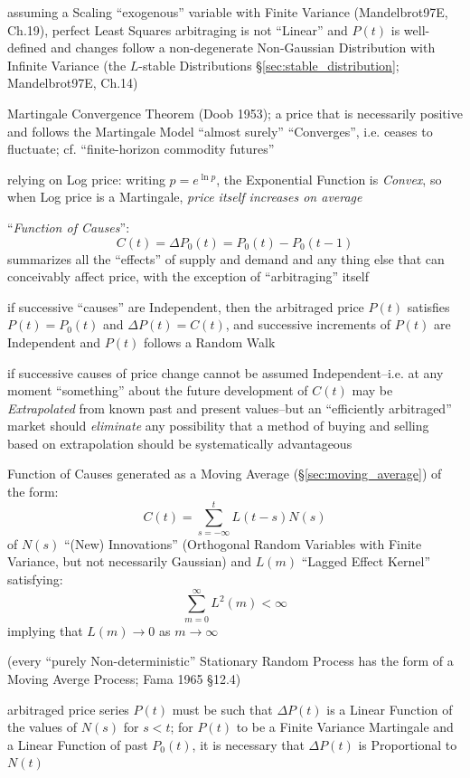 assuming a Scaling ``exogenous'' variable with Finite Variance (Mandelbrot97E,
Ch.19), perfect Least Squares arbitraging is not ``Linear'' and $P(t)$ is
well-defined and changes follow a non-degenerate Non-Gaussian Distribution with
Infinite Variance (the $L$-stable Distributions \S\ref{sec:stable_distribution};
Mandelbrot97E, Ch.14)

Martingale Convergence Theorem (Doob 1953); a price that is necessarily positive
and follows the Martingale Model ``almost surely'' ``Converges'', i.e. ceases to
fluctuate; cf. ``finite-horizon commodity futures''

relying on Log price: writing $p = e^{\ln p}$, the Exponential Function is
\emph{Convex}, so when Log price is a Martingale, \emph{price itself increases
on average}

``\emph{Function of Causes}'':
\[
  C(t) = \Delta P_0(t) = P_0(t) - P_0(t - 1)
\]
summarizes all the ``effects'' of supply and demand and any thing else that can
conceivably affect price, with the exception of ``arbitraging'' itself

if successive ``causes'' are Independent, then the arbitraged price $P(t)$
satisfies $P(t) = P_0(t)$ and $\Delta P(t) = C(t)$, and successive increments of
$P(t)$ are Independent and $P(t)$ follows a Random Walk

if successive causes of price change cannot be assumed Independent--i.e. at any
moment ``something'' about the future development of $C(t)$ may be
\emph{Extrapolated} from known past and present values--but an ``efficiently
arbitraged'' market should \emph{eliminate} any possibility that a method of
buying and selling based on extrapolation should be systematically advantageous

Function of Causes generated as a Moving Average (\S\ref{sec:moving_average}) of
the form:
\[
  C(t) = \sum_{s=-\infty}^t L(t-s) N(s)
\]
of $N(s)$ ``(New) Innovations'' (Orthogonal Random Variables with Finite
Variance, but not necessarily Gaussian) and $L(m)$ ``Lagged Effect Kernel''
satisfying:
\[
  \sum_{m=0}^\infty L^2(m) < \infty
\]
implying that $L(m) \to 0$ as $m \to \infty$

(every ``purely Non-deterministic'' Stationary Random Process has the form of a
Moving Averge Process; Fama 1965 \S 12.4)

arbitraged price series $P(t)$ must be such that $\Delta P(t)$ is a Linear
Function of the values of $N(s)$ for $s < t$; for $P(t)$ to be a Finite Variance
Martingale and a Linear Function of past $P_0(t)$, it is necessary that
$\Delta P(t)$ is Proportional to $N(t)$

